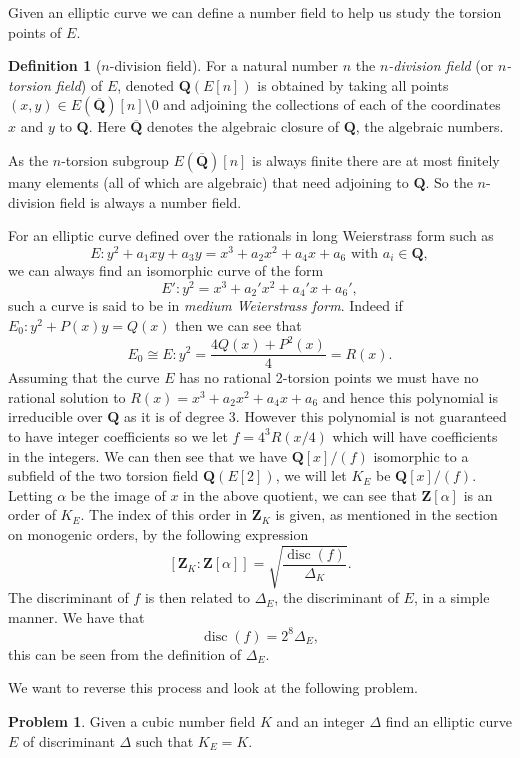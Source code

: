 \documentclass[12pt,a4paper,abstracton,bibtotoc]{scrreprt}
\theoremstyle{definition}
\newtheorem{defn}{Definition}
\newtheorem{prob}{Problem}
\newcommand{\QQ}{\mathbf{Q}}
\newcommand{\ZZ}{\mathbf{Z}}
\DeclareMathOperator{\disc}{disc}
\begin{document}
Given an elliptic curve we can define a number field to help us study the torsion points of $E$.

\begin{defn}[$n$-division field]
For a natural number $n$ the \emph{$n$-division field} (or \emph{$n$-torsion field}) of $E$, denoted $\QQ(E[n])$ is obtained by taking all points $(x,y) \in E(\overline{\QQ})[n]\setminus 0$ and adjoining the collections of each of the coordinates $x$ and $y$ to $\QQ$.
Here $\overline{\QQ}$ denotes the algebraic closure of $\QQ$, the algebraic numbers.
\end{defn}
As the $n$-torsion subgroup $E(\overline{\QQ})[n]$ is always finite there are at most finitely many elements (all of which are algebraic) that need adjoining to $\QQ$.
So the $n$-division field is always a number field.

\minisec{}

For an elliptic curve defined over the rationals in long Weierstrass form such as
\[
E \colon y^2 + a_1xy + a_3y = x^3 + a_2x^2 + a_4x + a_6\text{ with }a_i \in \QQ,
\]
we can always find an isomorphic curve of the form
\[
E' \colon y^2 = x^3 + a_2'x^2 + a_4'x + a_6',
\]
such a curve is said to be in \emph{medium Weierstrass form}.
Indeed if $E_0\colon y^2 + P(x)y  = Q(x)$ then we can see that
\[
E_0\cong E \colon y^2 = \frac{4Q(x) + P^2(x)}{4} = R(x).
\]
Assuming that the curve $E$ has no rational 2-torsion points we must have no rational solution to $R(x) = x^3 + a_2x^2 + a_4x + a_6$ and hence this polynomial is irreducible over $\QQ$ as it is of degree 3.
However this polynomial is not guaranteed to have integer coefficients so we let $f = 4^3 R(x/4)$ which will have coefficients in the integers.
We can then see that we have $\QQ[x]/(f)$ isomorphic to a subfield of the two torsion field $\QQ(E[2])$, we will let $K_E$ be $\QQ[x]/(f)$.
Letting $\alpha$ be the image of $x$ in the above quotient, we can see that $\ZZ[\alpha]$ is an order of $K_E$.
The index of this order in $\ZZ_K$ is given, as mentioned in the section on monogenic orders, by the following expression
\[
[\ZZ_K:\ZZ[\alpha]] = \sqrt{\frac{\disc(f)}{\Delta_K}}.
\]
The discriminant of $f$ is then related to $\Delta_E$, the discriminant of $E$, in a simple manner.
We have that
\[
\disc(f) = 2^8 \Delta_E,
\]
this can be seen from the definition of $\Delta_E$. %

We want to reverse this process and look at the following problem.

\begin{prob}
Given a cubic number field $K$ and an integer $\Delta$ find an elliptic curve $E$ of discriminant $\Delta$ such that $K_E = K$.
\end{prob}
\end{document}
